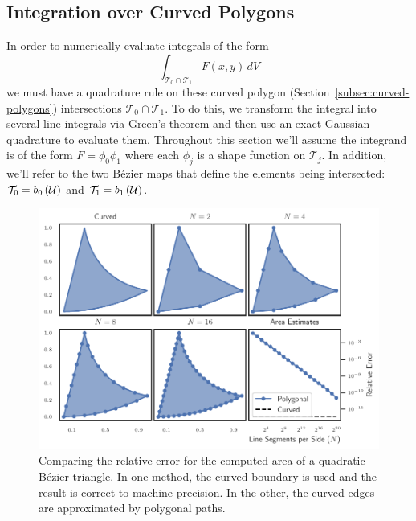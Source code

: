 \subsection{Integration over Curved Polygons}
\label{subsec:integration-on-curved}

In order to numerically evaluate integrals of the form
\begin{equation}
\int_{\mathcal{T}_0 \cap \mathcal{T}_1} F(x, y) \, dV
\end{equation}
we must have a quadrature rule on these curved polygon
(Section~\ref{subsec:curved-polygons}) intersections
\(\mathcal{T}_0 \cap \mathcal{T}_1\).
To do this, we transform the integral into several line integrals
via Green's theorem and then use an exact Gaussian quadrature to
evaluate them. Throughout this section we'll assume the integrand
is of the form \(F = \phi_0 \phi_1\) where each \(\phi_j\) is a shape
function on \(\mathcal{T}_j\). In addition, we'll refer to the two
B\'{e}zier maps that define the elements being intersected:
\(\mathcal{T}_0 = b_0\left(\mathcal{U}\right)\) and
\(\mathcal{T}_1 = b_1\left(\mathcal{U}\right)\).

\begin{figure}
  \includegraphics{../images/curved-mesh/polygon_vs_curved.pdf}
  \centering
  \captionsetup{width=.75\linewidth}
  \caption{Comparing the relative error for the computed area of a quadratic
    B\'{e}zier triangle. In one method, the curved boundary is used and the
    result is correct to machine precision. In the other, the curved edges
    are approximated by polygonal paths.}
  \label{fig:polygon-vs-curved}
\end{figure}

